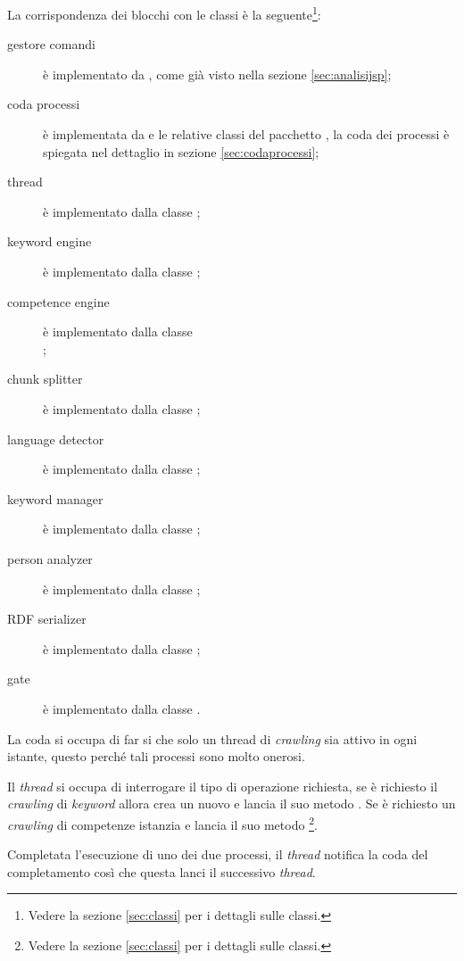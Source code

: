 \documentclass[tesi.tex]{subfiles}
\begin{document}
La corrispondenza dei blocchi con le classi \`e la
seguente\footnote{Vedere la sezione \ref{sec:classi} per i dettagli
  sulle classi.}:
\begin{description}
  \item[gestore comandi] \`e implementato da
    , come gi\`a visto nella sezione
    \ref{sec:analisijsp};
  \item[coda processi] \`e implementata da  e le
    relative classi del pacchetto , la coda dei
    processi \`e spiegata nel dettaglio in sezione
    \ref{sec:codaprocessi};
  \item[thread] \`e implementato dalla classe
    ;
  \item[keyword engine] \`e implementato dalla classe
    ;
  \item[competence engine] \`e implementato dalla classe\\
    ;
  \item[chunk splitter] \`e implementato dalla classe
    ;
  \item[language detector] \`e implementato dalla classe
    ;
  \item[keyword manager] \`e implementato dalla classe
    ;
  \item[person analyzer] \`e implementato dalla classe
    ;
  \item[RDF serializer] \`e implementato dalla classe
    ;
  \item[gate] \`e implementato dalla classe .
\end{description}

La coda si occupa di far si che solo un thread di \emph{crawling} sia
attivo in ogni istante, questo perch\'e tali processi sono molto
onerosi.

Il \emph{thread} si occupa di interrogare il tipo di operazione
richiesta, se \`e richiesto il \emph{crawling} di \emph{keyword}
allora crea un nuovo  e lancia il suo
metodo . Se \`e richiesto un \emph{crawling} di
competenze istanzia  e lancia il suo
metodo \footnote{Vedere la sezione \ref{sec:classi}
  per i dettagli sulle classi.}.

Completata l'esecuzione di uno dei due processi, il \emph{thread}
notifica la coda del completamento cos\`i che questa lanci il
successivo \emph{thread}.
\end{document}
